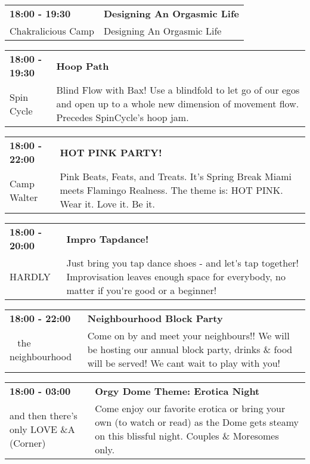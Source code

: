\begin{tabular}{ p{1in} p{2.2in} }
    \textbf{18:00 - 19:30} & \textbf{Designing An Orgasmic Life} \\
    Chakralicious Camp \newline  & Designing An Orgasmic Life \\
    \hline 
\end{tabular}
    
\begin{tabular}{ p{1in} p{2.2in} }
    \textbf{18:00 - 19:30} & \textbf{Hoop Path} \\
    Spin Cycle \newline  & Blind Flow with Bax! Use a blindfold to let go of our egos and open up to a whole new dimension of movement flow. Precedes SpinCycle's hoop jam. \\
    \hline 
\end{tabular}
    
\begin{tabular}{ p{1in} p{2.2in} }
    \textbf{18:00 - 22:00} & \textbf{HOT PINK PARTY!} \\
    Camp Walter \newline  & Pink Beats, Feats, and Treats. It's Spring Break Miami meets Flamingo Realness. The theme is: HOT PINK. Wear it. Love it. Be it. \\
    \hline 
\end{tabular}
    
\begin{tabular}{ p{1in} p{2.2in} }
    \textbf{18:00 - 20:00} & \textbf{Impro Tapdance!} \\
    HARDLY \newline  & Just bring you tap dance shoes - and let\'{}s tap together! Improvisation leaves enough space for everybody, no matter if you\'{}re good or a beginner! \\
    \hline 
\end{tabular}
    
\begin{tabular}{ p{1in} p{2.2in} }
    \textbf{18:00 - 22:00} & \textbf{Neighbourhood Block Party} \\
    ~ \newline the neighbourhood & Come on by and meet your neighbours!! We will be hosting our annual block party, drinks \& food will be served! We cant wait to play with you! \\
    \hline 
\end{tabular}
    
\begin{tabular}{ p{1in} p{2.2in} }
    \textbf{18:00 - 03:00} & \textbf{Orgy Dome Theme: Erotica Night} \\
    and then there's only LOVE \newline 4\&A (Corner) & Come enjoy our favorite erotica or bring your own (to watch or read) as the Dome gets steamy on this blissful night. Couples \& Moresomes only. \\
    \hline 
\end{tabular}
    
